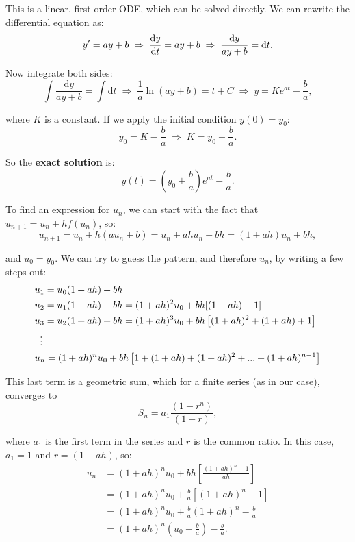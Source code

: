 This is a linear, first-order ODE, which can be solved directly. We can rewrite the differential equation as:
\begin{equation*}
  y' = ay+b \;\Rightarrow\; \dv{y}{t} = ay+b \;\Rightarrow\; \frac{\mathrm{d}y}{ay+b} = \mathrm{d}t.
\end{equation*}

Now integrate both sides:
\begin{equation*}
  \int \frac{\mathrm{d}y}{ay+b} = \int \mathrm{d}t \;\Rightarrow\; \frac{1}{a} \ln{(ay+b)} = t+C \;\Rightarrow\; y = Ke^{at} - \frac{b}{a},
\end{equation*}

where $K$ is a constant. If we apply the initial condition $y(0)=y_{0}$:
\begin{equation*}
    y_{0}=K-\frac{b}{a} \;\Rightarrow\; K=y_{0}+\frac{b}{a}.
\end{equation*}

So the \textbf{exact solution} is:
\begin{equation*}
    y(t) = \left(y_{0}+\frac{b}{a}\right)e^{at}-\frac{b}{a}.
\end{equation*}

To find an expression for $u_{n}$, we can start with the fact that $u_{n+1} = u_{n}+hf(u_{n})$, so:
\begin{equation*}
    u_{n+1} = u_{n} + h(au_{n}+b)=u_{n} + ahu_{n} + bh = (1+ah)u_{n} + bh,
\end{equation*}

and $u_{0} = y_{0}$. We can try to guess the pattern, and therefore $u_{n}$, by writing a few steps out:
\begin{align*}
    &u_{1} = u_{0}(1+ah) + bh \\
    &u_{2} = u_{1}(1+ah) + bh = (1+ah)^{2}u_{0}+bh[(1+ah)+1] \\
    &u_{3} = u_{2}(1+ah)+bh = (1+ah)^{3}u_{0}+bh \left[(1+ah)^{2}+(1+ah)+1\right] \\
    &\;\;\vdots \notag \\
    &u_{n} = (1+ah)^{n}u_{0}+bh \left[1+(1+ah)+(1+ah)^{2}+...+(1+ah)^{n-1}\right]
\end{align*}

This last term is a geometric sum, which for a finite series (as in our case), converges to
\begin{equation*}
  S_{n} = a_{1} \frac{(1-r^{n})}{(1-r)},
\end{equation*}

where $a_{1}$ is the first term in the series and $r$ is the common ratio. In this case, $a_{1}=1$ and $r=(1+ah)$, so:
\begin{align*}
  u_{n} &= (1+ah)^{n}u_{0} + bh \left[\frac{(1+ah)^{n}-1}{ah}\right] \\
        &= (1+ah)^{n}u_{0}  + \frac{b}{a}[(1+ah)^{n}-1] \\
        &= (1+ah)^{n}u_{0} + \frac{b}{a}(1+ah)^{n} - \frac{b}{a} \\
        &\boxed{= (1+ah)^{n} \left(u_{0}+\frac{b}{a}\right)-\frac{b}{a}.}
\end{align*}

